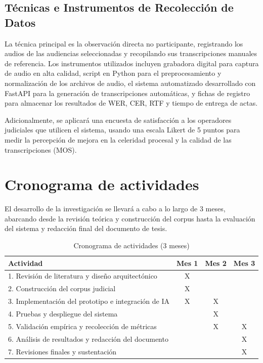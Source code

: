 \documentclass[12pt,a4paper,oneside]{article}
\begin{document}
\subsection{T\'ecnicas e Instrumentos de Recolecci\'on de Datos}

La t\'ecnica principal es la observaci\'on directa no participante, registrando los audios de las audiencias seleccionadas y recopilando sus transcripciones manuales de referencia. Los instrumentos utilizados incluyen grabadora digital para captura de audio en alta calidad, script en Python para el preprocesamiento y normalizaci\'on de los archivos de audio, el sistema automatizado desarrollado con FastAPI para la generaci\'on de transcripciones autom\'aticas, y fichas de registro para almacenar los resultados de WER, CER, RTF y tiempo de entrega de actas.

Adicionalmente, se aplicar\'a una encuesta de satisfacci\'on a los operadores judiciales que utilicen el sistema, usando una escala Likert de 5 puntos para medir la percepci\'on de mejora en la celeridad procesal y la calidad de las transcripciones (MOS).


\section{Cronograma de actividades}

El desarrollo de la investigaci\'on se llevar\'a a cabo a lo largo de 3 meses, abarcando desde la revisi\'on te\'orica y construcci\'on del corpus hasta la evaluaci\'on del sistema y redacci\'on final del documento de tesis.

\begin{table}[H]
\centering
\caption{Cronograma de actividades (3 meses)}
\begin{tabular}{|p{8cm}|c|c|c|}
\hline
\rowcolor{gray!20}
\textbf{Actividad} & \textbf{Mes 1} & \textbf{Mes 2} & \textbf{Mes 3} \\
\hline
1. Revisi\'on de literatura y dise\~no arquitect\'onico & X & & \\
\hline
2. Construcci\'on del corpus judicial & X & & \\
\hline
3. Implementaci\'on del prototipo e integraci\'on de IA & X & X & \\
\hline
4. Pruebas y despliegue del sistema & & X & \\
\hline
5. Validaci\'on emp\'irica y recolecci\'on de m\'etricas & & X & X \\
\hline
6. An\'alisis de resultados y redacci\'on del documento & & & X \\
\hline
7. Revisiones finales y sustentaci\'on & & & X \\
\hline
\end{tabular}
\label{tab:cronograma}
\end{table}
\end{document}
